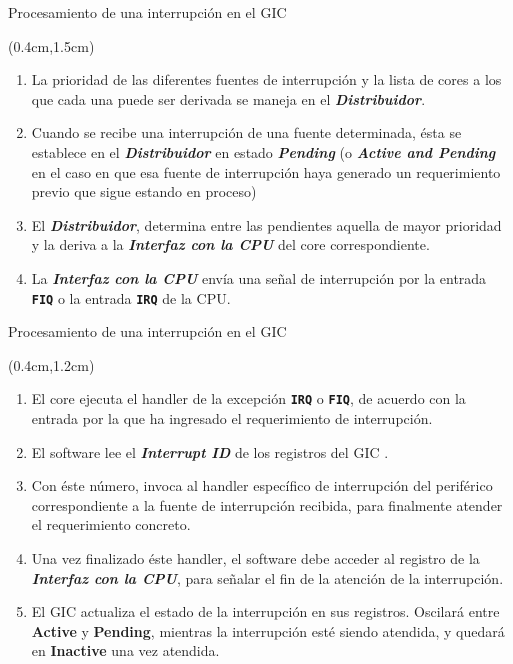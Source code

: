 \documentclass[table,x11names,aspectratio=169]{beamer}
\newcounter{saveenumi}
\newcommand{\seti}{\setcounter{saveenumi}{\value{enumi}}}
\newcommand{\conti}{\setcounter{enumi}{\value{saveenumi}}}
\begin{document}
\begin{frame}[t]{Procesamiento de una interrupción en el GIC}
 \begin{textblock*}{\textwidth}(0.4cm,1.5cm)
  \begin{enumerate}[<+(1)->]\justifying \parskip 0.3cm \seti
   \item La prioridad de las diferentes fuentes de interrupción y la lista de cores a los que cada una puede ser derivada se maneja en el \textbf{\textit{Distribuidor}}.
   \item Cuando se recibe una interrupción de una fuente determinada, ésta se establece en el \textbf{\textit{Distribuidor}} en estado \textbf{\textit{\color{Blue3}Pending}} (o \textbf{\textit{\color{Blue4}Active and Pending}} en el caso en que esa fuente de interrupción haya generado un requerimiento previo que sigue estando en proceso)
   \item El \textbf{\textit{Distribuidor}}, determina entre las pendientes aquella de mayor prioridad y la deriva a la \textit{\textbf{Interfaz con la CPU}} del core correspondiente.
   \item La \textit{\textbf{Interfaz con la CPU}} envía una señal de interrupción por la entrada \texttt{\textbf{FIQ}} o la entrada \texttt{\textbf{IRQ}} de la CPU.
   \seti
  \end{enumerate}
 \end{textblock*}
\end{frame}

\begin{frame}[t]{Procesamiento de una interrupción en el GIC}
 \begin{textblock*}{\textwidth}(0.4cm,1.2cm)
  \begin{enumerate}[<+->]\justifying \parskip 0.15cm \conti
   \item El core ejecuta el handler de la excepción \textbf{\texttt{IRQ}} o \textbf{\texttt{FIQ}}, de acuerdo con la entrada por la que ha ingresado el requerimiento de interrupción.
   \item El software lee el \textbf{\textit{Interrupt ID}} de los registros del GIC .
   \item Con éste número, invoca al handler específico de interrupción del periférico correspondiente a la fuente de interrupción recibida, para finalmente atender el requerimiento concreto.
   \item Una vez finalizado éste handler, el software debe acceder al registro de la \textit{\textbf{Interfaz con la CPU}},  para señalar el fin de la atención de la interrupción.
   \item El GIC actualiza el estado de la interrupción en sus registros. Oscilará entre \textbf{\color{Blue2}Active} y \textbf{\color{Blue3}Pending}, mientras la interrupción esté siendo atendida, y quedará en \textbf{\color{Blue1}Inactive} una vez atendida.
  \end{enumerate}
 \end{textblock*}
\end{frame}
\end{document}
